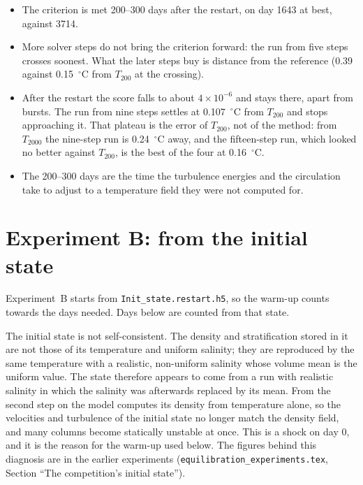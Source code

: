 \documentclass{article}
\begin{document}
\begin{itemize}
\item The criterion is met 200--300 days after the restart, on day 1643 at best, against 3714.
\item More solver steps do not bring the criterion forward: the run from five steps crosses soonest. What the later steps buy is distance from the reference (0.39 against 0.15~$^\circ$C from $T_{200}$ at the crossing).
\item After the restart the score falls to about $4\times10^{-6}$ and stays there, apart from bursts. The run from nine steps settles at 0.107~$^\circ$C from $T_{200}$ and stops approaching it. That plateau is the error of $T_{200}$, not of the method: from $T_{2000}$ the nine-step run is 0.24~$^\circ$C away, and the fifteen-step run, which looked no better against $T_{200}$, is the best of the four at 0.16~$^\circ$C.
\item The 200--300 days are the time the turbulence energies and the circulation take to adjust to a temperature field they were not computed for.
\end{itemize}

\section{Experiment B: from the initial state}\label{sec:expinit}

Experiment~B starts from \texttt{Init\_state.restart.h5}, so the warm-up counts towards the days needed. Days below are counted from that state.

The initial state is not self-consistent. The density and stratification stored in it are not those of its temperature and uniform salinity; they are reproduced by the same temperature with a realistic, non-uniform salinity whose volume mean is the uniform value. The state therefore appears to come from a run with realistic salinity in which the salinity was afterwards replaced by its mean. From the second step on the model computes its density from temperature alone, so the velocities and turbulence of the initial state no longer match the density field, and many columns become statically unstable at once. This is a shock on day 0, and it is the reason for the warm-up used below. The figures behind this diagnosis are in the earlier experiments (\texttt{equilibration\_experiments.tex}, Section ``The competition's initial state'').
\end{document}
